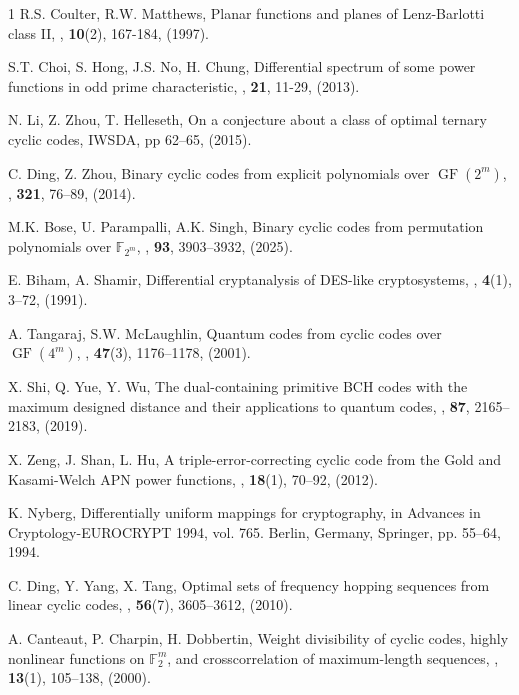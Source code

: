 \documentclass[pdflatex,sn-mathphys-num]{sn-jnl}%
\theoremstyle{thmstyleone}%
\theoremstyle{thmstyletwo}%
\theoremstyle{thmstylethree}%
\begin{document}
\begin{thebibliography}{1}
R.S. Coulter, R.W. Matthews, \newblock Planar functions and planes of Lenz-Barlotti class II, , \textbf{10}(2), 167-184, (1997).

S.T. Choi, S. Hong, J.S. No, H. Chung, \newblock Differential spectrum of some power functions in odd prime characteristic, , \textbf{21}, 11-29, (2013).

N. Li, Z. Zhou, T. Helleseth, \newblock On a conjecture about a class of optimal ternary cyclic codes, IWSDA,
pp 62–65, (2015).

    C. Ding, Z. Zhou, \newblock Binary cyclic codes from explicit polynomials over $\operatorname{GF}(2^m)$, , \textbf{321}, 76–89, (2014).

M.K. Bose, U. Parampalli, A.K. Singh, \newblock Binary cyclic codes from permutation polynomials over $\mathbb{F}_{2^m}$, , \textbf{93}, 3903–3932, (2025).


 E. Biham, A. Shamir, \newblock Differential cryptanalysis of DES-like cryptosystems, , \textbf{4}(1), 3–72, (1991).

 A. Tangaraj, S.W. McLaughlin, \newblock Quantum codes from cyclic codes over $\operatorname{GF}(4^m)$, , \textbf{47}(3), 1176–1178, (2001).

 X. Shi, Q. Yue, Y. Wu, \newblock The dual-containing primitive BCH codes with the maximum designed distance
and their applications to quantum codes, , \textbf{87}, 2165–2183, (2019).

X. Zeng, J. Shan, L. Hu, \newblock A triple-error-correcting cyclic code from the Gold and Kasami-Welch APN power functions, , \textbf{18}(1), 70–92, (2012).

 K. Nyberg, \newblock Differentially uniform mappings for cryptography, in Advances in Cryptology-EUROCRYPT 1994, vol. 765. Berlin,
Germany, Springer, pp. 55–64, 1994.

 C. Ding, Y. Yang, X. Tang, \newblock Optimal sets of frequency hopping sequences from linear cyclic codes, , \textbf{56}(7), 3605–3612, (2010).

 A. Canteaut, P. Charpin, H. Dobbertin, \newblock Weight divisibility of cyclic codes, highly nonlinear functions on $\mathbb{F}_2^m$, and crosscorrelation of maximum-length sequences, , \textbf{13}(1), 105–138, (2000).


\end{thebibliography}
\end{document}
